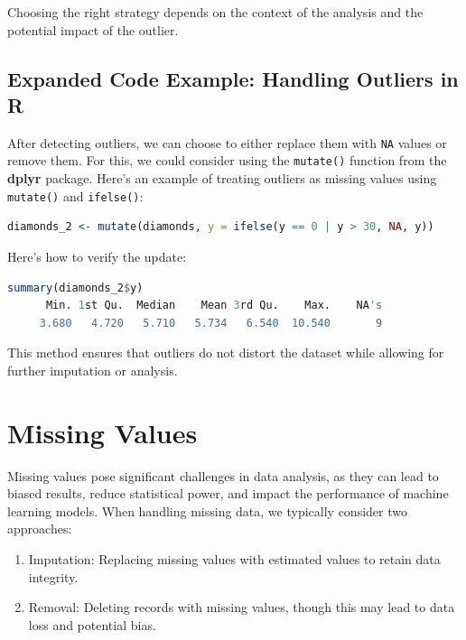 \documentclass[
]{book}
\newcommand{\passthrough}[1]{#1}
\providecommand{\tightlist}{%
  \setlength{\itemsep}{0pt}\setlength{\parskip}{0pt}}
\theoremstyle{definition}
\theoremstyle{definition}
\theoremstyle{definition}
\theoremstyle{definition}
\theoremstyle{remark}
\begin{document}
Choosing the right strategy depends on the context of the analysis and the potential impact of the outlier.

\subsection*{Expanded Code Example: Handling Outliers in R}\label{expanded-code-example-handling-outliers-in-r}

After detecting outliers, we can choose to either replace them with \passthrough{\lstinline!NA!} values or remove them. For this, we could consider using the \passthrough{\lstinline!mutate()!} function from the \textbf{dplyr} package. Here's an example of treating outliers as missing values using \passthrough{\lstinline!mutate()!} and \passthrough{\lstinline!ifelse()!}:

\begin{lstlisting}[language=R]
diamonds_2 <- mutate(diamonds, y = ifelse(y == 0 | y > 30, NA, y))
\end{lstlisting}

Here's how to verify the update:

\begin{lstlisting}[language=R]
summary(diamonds_2$y)
      Min. 1st Qu.  Median    Mean 3rd Qu.    Max.    NA's 
     3.680   4.720   5.710   5.734   6.540  10.540       9
\end{lstlisting}

This method ensures that outliers do not distort the dataset while allowing for further imputation or analysis.

\section{Missing Values}\label{missing-values}

Missing values pose significant challenges in data analysis, as they can lead to biased results, reduce statistical power, and impact the performance of machine learning models. When handling missing data, we typically consider two approaches:

\begin{enumerate}
\def\labelenumi{\arabic{enumi}.}
\tightlist
\item
  Imputation: Replacing missing values with estimated values to retain data integrity.\\
\item
  Removal: Deleting records with missing values, though this may lead to data loss and potential bias.
\end{enumerate}
\end{document}
